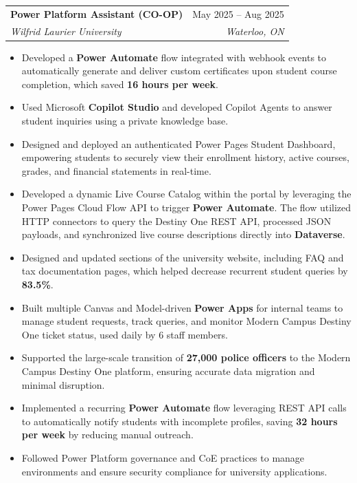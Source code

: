\documentclass[letterpaper,11pt]{article}
\makeatletter
\newcommand{\resumeItem}[1]{
  \item\small{
    {#1 \vspace{-2pt}}
  }
}
\newcommand{\resumeSubheading}[4]{
  \vspace{-2pt}\item
    \begin{tabular*}{0.97\textwidth}[t]{l@{\extracolsep{\fill}}r}
      \textbf{#1} & #2 \\
      \textit{\small#3} & \textit{\small #4} \\
    \end{tabular*}\vspace{-7pt}
}
\newcommand{\resumeItemListStart}{\begin{itemize}}
\newcommand{\resumeItemListEnd}{\end{itemize}\vspace{-5pt}}
\makeatother
\begin{document}
    \resumeSubheading
      {Power Platform Assistant (CO-OP)}{May 2025 – Aug 2025}
      {Wilfrid Laurier University}{Waterloo, ON}
      \resumeItemListStart
        \resumeItem{Developed a \textbf{Power Automate} flow integrated with webhook events to automatically generate and deliver custom certificates upon student course completion, which saved \textbf{16 hours per week}.}
        \resumeItem{Used Microsoft \textbf{Copilot Studio} and developed Copilot Agents to answer student inquiries using a private knowledge base.}
        \resumeItem{Designed and deployed an authenticated Power Pages Student Dashboard, empowering students to securely view their enrollment history, active courses, grades, and financial statements in real-time.}
        \resumeItem{Developed a dynamic Live Course Catalog within the portal by leveraging the Power Pages Cloud Flow API to trigger \textbf{Power Automate}. The flow utilized HTTP connectors to query the Destiny One REST API, processed JSON payloads, and synchronized live course descriptions directly into \textbf{Dataverse}.}
        \resumeItem{Designed and updated sections of the university website, including FAQ and tax documentation pages, which helped decrease recurrent student queries by \textbf{83.5\%}.}
        \resumeItem{Built multiple Canvas and Model-driven \textbf{Power Apps} for internal teams to manage student requests, track queries, and monitor Modern Campus Destiny One ticket status, used daily by 6 staff members.}
        \resumeItem{Supported the large-scale transition of \textbf{27,000 police officers} to the Modern Campus Destiny One platform, ensuring accurate data migration and minimal disruption.}
        \resumeItem{Implemented a recurring \textbf{Power Automate} flow leveraging REST API calls to automatically notify students with incomplete profiles, saving \textbf{32 hours per week} by reducing manual outreach.}
        \resumeItem{Followed Power Platform governance and CoE practices to manage environments and ensure security compliance for university applications.}
      \resumeItemListEnd
\end{document}
